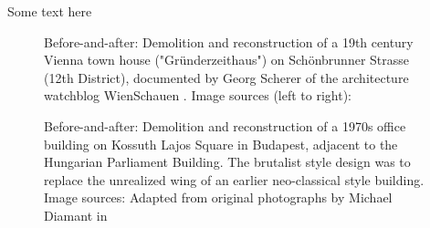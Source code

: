 \documentclass{article}
\begin{document}
Some text here

\begin{figure}[ht!]
    \centering
    \caption{Before-and-after: Demolition and reconstruction of a 19th century Vienna town house ("Gründerzeithaus") on Schönbrunner Strasse (12th District), documented by Georg Scherer of the architecture watchblog WienSchauen \cite{scherer_zerstorung_nodate}. Image sources (left to right): \cite{scherer_schonbrunner_2018}\cite{wikimedia_commons_user_guentherz_wohnhaus_2014}}
    \label{fig:vienna}
\end{figure}

\begin{figure}[ht!]
    \centering
    \caption{Before-and-after: Demolition and reconstruction of a 1970s office building on Kossuth Lajos Square in Budapest, adjacent to the Hungarian Parliament Building. The brutalist style design was to replace the unrealized wing of an earlier neo-classical style building. Image sources: Adapted from original photographs by Michael Diamant in \cite{natalia_michael_2021} }
    \label{fig:budaptest}
\end{figure}
\end{document}

